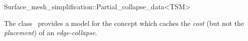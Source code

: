 

\begin{ccRefClass}{Surface_mesh_simplification::Partial_collapse_data<TSM>}


\ccDefinition

The class \ccRefName\ provides a model for the  concept
which caches the {\em cost} (but not the {\em placement}) of an {\em edge-collapse}.


\ccIsModel
{}

\ccSeeAlso
{}\\
\\
\\
\\
\\

\end{ccRefClass}



